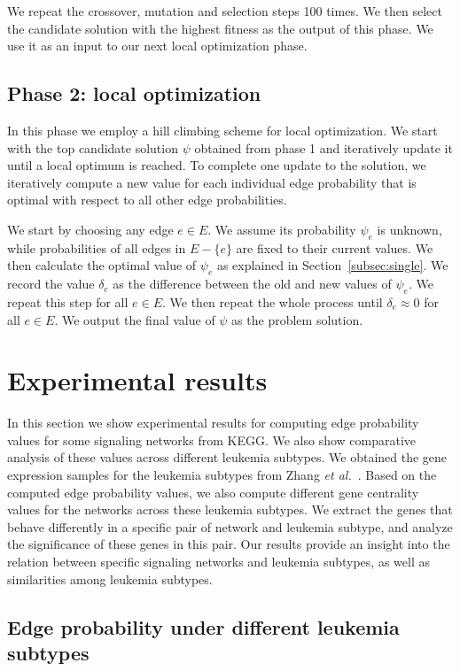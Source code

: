 \documentclass[runningheads,a4paper]{llncs}
\begin{document}
We repeat the crossover, mutation and selection steps 100 times. We then select
the candidate solution with the highest fitness as the output of this phase. We
use it as an input to our next local optimization phase.

\subsection{Phase 2: local optimization}
\label{subsec:phase2}

In this phase we employ a hill climbing scheme for local optimization. We start
with the top candidate solution $\psi$ obtained from phase 1 and iteratively
update it until a local optimum is reached. To complete one update to the
solution, we iteratively compute a new value for each individual edge
probability that is optimal with respect to all other edge probabilities.

We start by choosing any edge $e \in E$. We assume its probability $\psi_e$ is
unknown, while probabilities of all edges in $E - \{e\}$ are fixed to their
current values. We then calculate the optimal value of $\psi_e$ as explained in
Section~\ref{subsec:single}. We record the value $\delta_e$ as the difference
between the old and new values of $\psi_e$. We repeat this step for all $e \in
E$. We then repeat the whole process until $\delta_e \approx 0$ for all $e \in
E$.
We output the final value of $\psi$ as the problem solution.


\section{Experimental results}
\label{sec:results}

In this section we show experimental results for computing edge probability
values for some signaling networks from KEGG. We also show comparative
analysis of these values across different leukemia subtypes. We obtained the
gene expression samples for the leukemia subtypes from Zhang {\it et
al.}~\cite{mullighan}. Based on the computed edge probability values, we also
compute different gene centrality values for the networks across these leukemia
subtypes. We extract the genes that behave differently in a specific pair
of network and leukemia subtype, and analyze the significance of these genes in
this pair. Our results provide an insight into the relation between specific
signaling networks and leukemia subtypes, as well as similarities among leukemia
subtypes.

\subsection{Edge probability under different leukemia subtypes}
\label{sec:results:edge}
\end{document}
